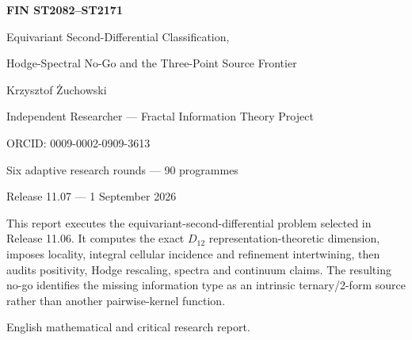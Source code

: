\documentclass[11pt,a4paper]{article}
\begin{document}
\begin{titlepage}\centering\vspace*{14mm}
{\Huge\bfseries FIN ST2082--ST2171\par}\vspace{4mm}
{\LARGE Equivariant Second-Differential Classification,\par}\vspace{2mm}
{\LARGE Hodge-Spectral No-Go and the Three-Point Source Frontier\par}\vspace{12mm}
{\Large Krzysztof \.Zuchowski\par}
{\normalsize Independent Researcher --- Fractal Information Theory Project\par}
{\normalsize ORCID: 0009-0002-0909-3613\par}\vspace{9mm}
{\large Six adaptive research rounds --- 90 programmes\par}
{\large Release 11.07 --- 1 September 2026\par}
\vfill
\begin{minipage}{.87\textwidth}\small
This report executes the equivariant-second-differential problem selected in
Release 11.06.  It computes the exact $D_{12}$ representation-theoretic
dimension, imposes locality, integral cellular incidence and refinement
intertwining, then audits positivity, Hodge rescaling, spectra and continuum
claims.  The resulting no-go identifies the missing information type as an
intrinsic ternary/2-form source rather than another pairwise-kernel function.
\end{minipage}\vfill
{\small English mathematical and critical research report.}
\end{titlepage}
\end{document}
